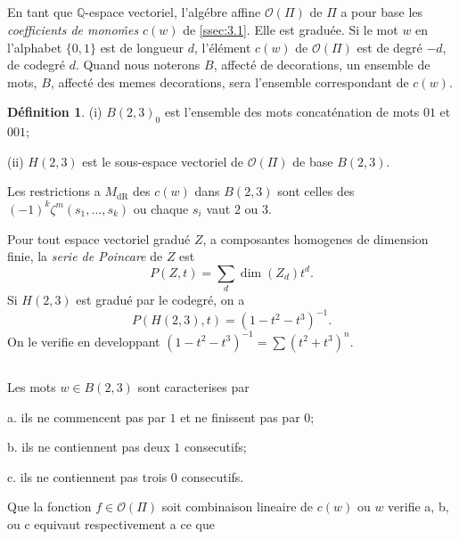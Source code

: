 \documentclass[11pt,a4paper]{article}
\theoremstyle{plain}
\theoremstyle{definition}
\newtheorem{definition}[theorem]{D\'efinition}
\newcommand{\Q}{\mathbb{Q}}
\newcommand{\dR}{\mathrm{dR}}
\begin{document}
\subsection{}\label{ssec:6.1}

En tant que $\Q$-espace vectoriel, l'alg\'ebre affine $\mathcal{O}(\Pi)$ de $\Pi$ a pour base les \emph{coefficients de mono\^mes} $c(w)$ de \ref{ssec:3.1}. Elle est gradu\'ee. Si le mot $w$ en l'alphabet $\{0,1\}$ est de longueur $d$, l'\'el\'ement $c(w)$ de $\mathcal{O}(\Pi)$ est de degr\'e $-d$, de codegr\'e $d$. Quand nous noterons $B$, affect\'e de decorations, un ensemble de mots, $B$, affect\'e des memes decorations, sera l'ensemble correspondant de $c(w)$.

\begin{definition}\label{def:6.2}
(i) $B(2,3)_0$ est l'ensemble des mots concat\'enation de mots $01$ et $001$;

(ii) $H(2,3)$ est le sous-espace vectoriel de $\mathcal{O}(\Pi)$ de base $B(2,3)$.
\end{definition}

Les restrictions a $M_{\dR}$ des $c(w)$ dans $B(2,3)$ sont celles des $(-1)^k \zeta^m(s_1,\ldots,s_k)$ ou chaque $s_i$ vaut $2$ ou $3$.

Pour tout espace vectoriel gradu\'e $Z$, a composantes homogenes de dimension finie, la \emph{serie de Poincare} de $Z$ est
\begin{equation}\label{eq:6.2.1}
P(Z,t) = \sum_d \dim(Z_d) t^d.
\end{equation}
Si $H(2,3)$ est gradu\'e par le codegr\'e, on a
\begin{equation}\label{eq:6.2.2}
P(H(2,3),t) = (1 - t^2 - t^3)^{-1}.
\end{equation}
On le verifie en developpant $(1 - t^2 - t^3)^{-1} = \sum (t^2 + t^3)^n$.

\subsection{}\label{ssec:6.3}

Les mots $w \in B(2,3)$ sont caracterises par

a. ils ne commencent pas par $1$ et ne finissent pas par $0$;

b. ils ne contiennent pas deux $1$ consecutifs;

c. ils ne contiennent pas trois $0$ consecutifs.

Que la fonction $f \in \mathcal{O}(\Pi)$ soit combinaison lineaire de $c(w)$ ou $w$ verifie a, b, ou c equivaut respectivement a ce que
\end{document}
